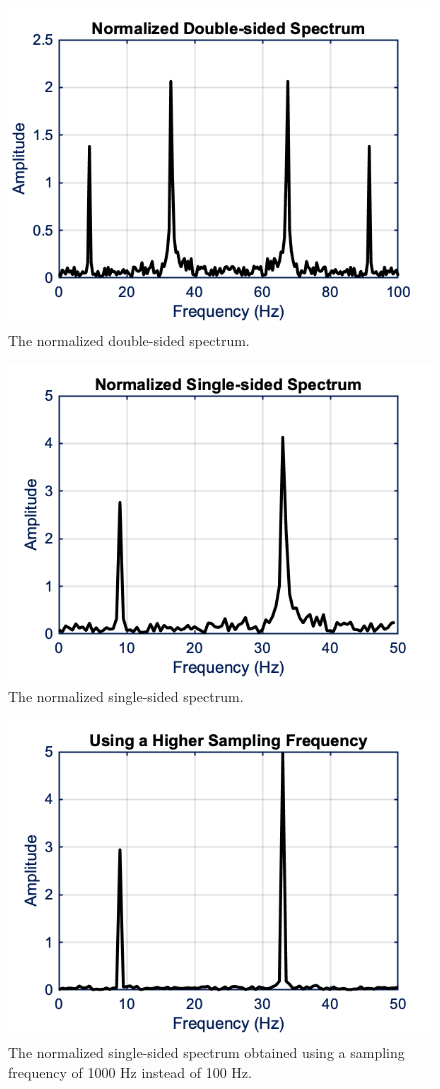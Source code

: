 \begin{figure}[H]
    \centering
    \includegraphics[width = 4 in]{Chapters/Signal Processing/Figures/Normalized Double-sided Spectrum.png}
    \caption{The normalized double-sided spectrum.}
    \label{fig:Normalized Double-sided Spectrum}
\end{figure}

\begin{figure}[H]
    \centering
    \includegraphics[width = 4 in]{Chapters/Signal Processing/Figures/Normalized Single-sided Spectrum.png}
    \caption{The normalized single-sided spectrum.}
    \label{fig:Normalized Single-sided Spectrum}
\end{figure}

\begin{figure}[H]
    \centering
    \includegraphics[width = 4 in]{Chapters/Signal Processing/Figures/Using a Higher Sampling Frequency.png}
    \caption{The normalized single-sided spectrum obtained using a sampling frequency of 1000 Hz instead of 100 Hz.}
    \label{fig:FFT Using a Higher Sampling Frequency}
\end{figure}

